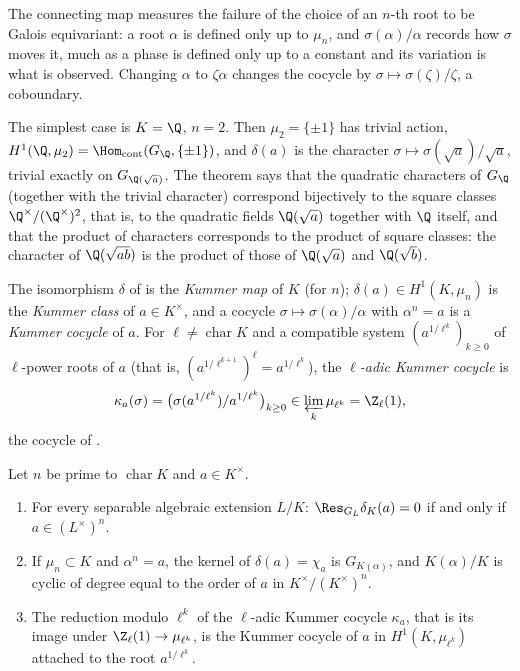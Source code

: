 \begin{remark}
The connecting map measures the failure of the choice of an $n$-th root to be Galois equivariant: a root $\alpha$ is defined only up to $\mu_n$, and
$\sigma(\alpha)/\alpha$ records how $\sigma$ moves it, much as a phase is defined only up to a constant and its variation is what is observed. Changing $\alpha$ to
$\zeta\alpha$ changes the cocycle by $\sigma\mapsto\sigma(\zeta)/\zeta$, a coboundary.

The simplest case is $K=\Q$, $n=2$. Then $\mu_2=\{\pm1\}$ has trivial action, $H^1(\Q,\mu_2)=\Hom_{\mathrm{cont}}(G_\Q,\{\pm1\})$, and $\delta(a)$ is the character
$\sigma\mapsto\sigma(\sqrt a)/\sqrt a$, trivial exactly on $G_{\Q(\sqrt a)}$. The theorem says that the quadratic characters of $G_\Q$ (together with the trivial character)
correspond bijectively to the square classes $\Q^\times/(\Q^\times)^2$, that is, to the quadratic fields $\Q(\sqrt a)$ together with $\Q$ itself, and that the product of
characters corresponds to the product of square classes: the character of $\Q(\sqrt{ab})$ is the product of those of $\Q(\sqrt a)$ and $\Q(\sqrt b)$.
\end{remark}

\begin{definition}\label{def:galcoh:kummer-class}
The isomorphism $\delta$ of  is the \emph{Kummer map} of $K$ (for $n$); $\delta(a)\in H^1(K,\mu_n)$ is the \emph{Kummer class} of
$a\in K^\times$, and a cocycle $\sigma\mapsto\sigma(\alpha)/\alpha$ with $\alpha^n=a$ is a \emph{Kummer cocycle} of $a$. For $\ell\ne\operatorname{char}K$ and a compatible
system $(a^{1/\ell^k})_{k\ge0}$ of $\ell$-power roots of $a$ (that is, $(a^{1/\ell^{k+1}})^\ell=a^{1/\ell^k}$), the \emph{$\ell$-adic Kummer cocycle} is
\[
\kappa_a(\sigma)=\bigl(\sigma(a^{1/\ell^k})/a^{1/\ell^k}\bigr)_{k\ge0}\in\varprojlim_k\mu_{\ell^k}=\Z_\ell(1),
\]
the cocycle of .
\end{definition}

\begin{proposition}\label{prop:galcoh:kummer-class}
Let $n$ be prime to $\operatorname{char}K$ and $a\in K^\times$.
\begin{enumerate}[label=(\roman*)]
\item For every separable algebraic extension $L/K$: $\Res_{G_L}\delta_K(a)=0$ if and only if $a\in(L^\times)^n$.
\item If $\mu_n\subset K$ and $\alpha^n=a$, the kernel of $\delta(a)=\chi_a$ is $G_{K(\alpha)}$, and $K(\alpha)/K$ is cyclic of degree equal to the order of $a$ in
$K^\times/(K^\times)^n$.
\item The reduction modulo $\ell^k$ of the $\ell$-adic Kummer cocycle $\kappa_a$, that is its image under $\Z_\ell(1)\to\mu_{\ell^k}$, is the Kummer cocycle of $a$ in
$H^1(K,\mu_{\ell^k})$ attached to the root $a^{1/\ell^k}$.
\end{enumerate}
\end{proposition}

